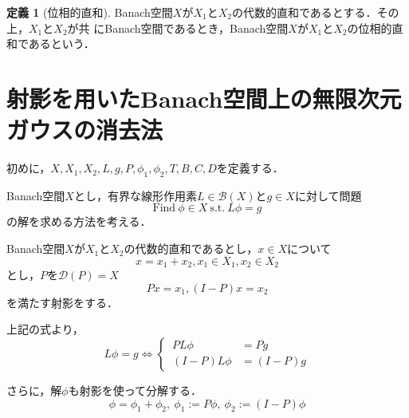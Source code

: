\documentclass[11pt,a4paper,titlepage]{jsreport}
\theoremstyle{definition}
\newtheorem{dfn}{定義}
\begin{document}
\begin{dfn}[位相的直和]
  Banach空間$X$が$X_1$と$X_2$の代数的直和であるとする．その上，$X_1$と$X_2$が共 にBanach空間であるとき，Banach空間$X$が$X_1$と$X_2$の位相的直和であるという．
\end{dfn}

\section{射影を用いたBanach空間上の無限次元ガウスの消去法}
\label{sct:無限次元ガウスの消去法}

  初めに，$X,X_1,X_2,L,g,P,\phi_1,\phi_2,T,B,C,D$を定義する．

  Banach空間$X$とし，有界な線形作用素$L \in \mathcal{B}(X)$と$g\in X$に対して問題
  \begin{equation*}
    \text{Find}\ \phi \in X \ \text{s.t.}\ L\phi = g
  \end{equation*}
  の解を求める方法を考える．

  Banach空間$X$が$X_1$と$X_2$の代数的直和であるとし，$x \in X$について
  \begin{equation*}
    x=x_1+x_2, x_1 \in X_1, x_2 \in X_2
  \end{equation*}
  とし，$P$を$\mathcal{D}(P)=X$
  \begin{equation*}
    Px=x_1, (I-P)x=x_2
  \end{equation*}
  を満たす射影をする．

  上記の式より，
  \begin{equation*}
    L \phi = g \Leftrightarrow
    \left\{ \,
    \begin{aligned}
      PL\phi &= Pg \\
      (I-P)L\phi &= (I-P)g
    \end{aligned}
    \right.
  \end{equation*}

  さらに，解$\phi$も射影を使って分解する．
  \begin{equation*}
    \phi = \phi_1 + \phi_2,\ \phi_1:=P\phi,\ \phi_2:=(I-P)\phi
  \end{equation*}
\end{document}
